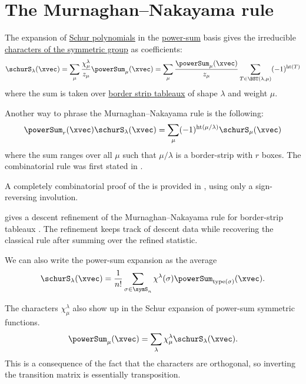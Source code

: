 
\section[murnaghanNakayamaRule]{The Murnaghan--Nakayama rule}


The expansion of \hyperref[schurS]{Schur polynomials} in the
\hyperref[powerSum]{power-sum} basis gives the
irreducible \hyperref[representationCharacter]{characters of the symmetric group} as coefficients:
\begin{equation*}
 \schurS_\lambda(\xvec) 
  = \sum_{\mu} \frac{\chi^{\lambda}_{\mu}}{z_\mu} \powerSum_{\mu}(\xvec)
  = \sum_{\mu} \frac{\powerSum_{\mu}(\xvec)}{z_\mu} \sum_{T \in \BST(\lambda,\mu)} (-1)^{\mathrm{ht}(T)}
\end{equation*} 
where the sum is taken over \hyperref[borderStripTableaux]{border strip
tableaux} of shape $\lambda$ and weight $\mu$.

Another way to phrase the Murnaghan--Nakayama rule is the following:
\begin{equation*}
\powerSum_r(\xvec) \schurS_\lambda(\xvec) = \sum_{\mu} (-1)^{\mathrm{ht}(\mu/\lambda)} \schurS_\mu(\xvec)
\end{equation*} 
where the sum ranges over all $\mu$ such that $\mu/\lambda$ is a border-strip with $r$ boxes.
The combinatorial rule was first stated in \cite{Murnaghan1937,Nakayama1940}.

A completely combinatorial proof of the
\label{murnaghanNakayamaRuleDefinition}
is provided in \cite{Mendes2019}, using only a sign-reversing involution.

 gives a descent refinement of the
Murnaghan--Nakayama rule for border-strip tableaux
\cite{Pfannerer2021RefinedMN}.  The refinement keeps track of descent data
while recovering the classical rule after summing over the refined statistic.


We can also write the power-sum expansion as the average
\begin{equation*}
 \schurS_\lambda(\xvec) 
  = \frac{1}{n!} \sum_{\sigma \in \symS_n} \chi^{\lambda}(\sigma) \powerSum_{\text{type}(\sigma)}(\xvec).
\end{equation*}

The characters $\chi^{\lambda}_{\mu}$ also show up in the Schur expansion of
power-sum symmetric functions.
\begin{equation*}
 \powerSum_\mu(\xvec) =  \sum_{\lambda} \chi^{\lambda}_{\mu} \schurS_{\lambda}(\xvec).
\end{equation*}
This is a consequence of the fact that the characters are orthogonal, so
inverting the transition matrix is essentially transposition.

